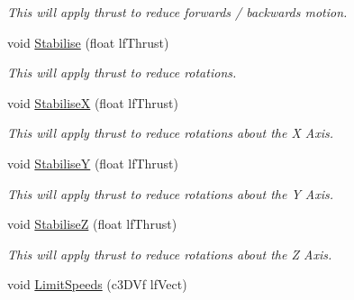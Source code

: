 \begin{DoxyCompactItemize}
\begin{DoxyCompactList}\small\item\em This will apply thrust to reduce forwards / backwards motion. \end{DoxyCompactList}\item 
\hypertarget{classc_momentum_a1f20db0caa8b8e903193287988b3f27e}{
void \hyperlink{classc_momentum_a1f20db0caa8b8e903193287988b3f27e}{Stabilise} (float lfThrust)}
\label{classc_momentum_a1f20db0caa8b8e903193287988b3f27e}

\begin{DoxyCompactList}\small\item\em This will apply thrust to reduce rotations. \end{DoxyCompactList}\item 
\hypertarget{classc_momentum_a4706da0c9c1ad3aafe30080b83359ba5}{
void \hyperlink{classc_momentum_a4706da0c9c1ad3aafe30080b83359ba5}{StabiliseX} (float lfThrust)}
\label{classc_momentum_a4706da0c9c1ad3aafe30080b83359ba5}

\begin{DoxyCompactList}\small\item\em This will apply thrust to reduce rotations about the X Axis. \end{DoxyCompactList}\item 
\hypertarget{classc_momentum_adf603b9ff43241e9d2efdfdc3adebd11}{
void \hyperlink{classc_momentum_adf603b9ff43241e9d2efdfdc3adebd11}{StabiliseY} (float lfThrust)}
\label{classc_momentum_adf603b9ff43241e9d2efdfdc3adebd11}

\begin{DoxyCompactList}\small\item\em This will apply thrust to reduce rotations about the Y Axis. \end{DoxyCompactList}\item 
\hypertarget{classc_momentum_aa93d50eaf70304b4e94981cd514aa170}{
void \hyperlink{classc_momentum_aa93d50eaf70304b4e94981cd514aa170}{StabiliseZ} (float lfThrust)}
\label{classc_momentum_aa93d50eaf70304b4e94981cd514aa170}

\begin{DoxyCompactList}\small\item\em This will apply thrust to reduce rotations about the Z Axis. \end{DoxyCompactList}\item 
\hypertarget{classc_momentum_af70dbc27cb23dbb630934916a5ce1578}{
void \hyperlink{classc_momentum_af70dbc27cb23dbb630934916a5ce1578}{LimitSpeeds} (c3DVf lfVect)}
\label{classc_momentum_af70dbc27cb23dbb630934916a5ce1578}


\end{DoxyCompactItemize}
